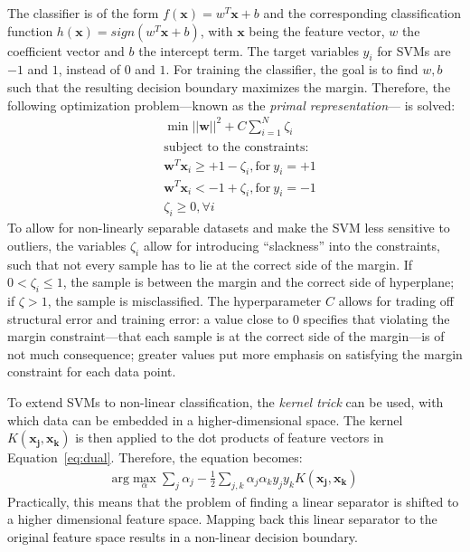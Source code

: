 \documentclass[a4paper]{article}
\begin{document}
The classifier is of the form $f(\mathbf{x}) = w^T\mathbf{x} + b$ and
the corresponding classification function
$h(\mathbf{x}) = sign(w^T\mathbf{x} + b)$, with $\mathbf{x}$ being the
feature vector, $w$ the coefficient vector and $b$ the intercept
term. The target variables $y_i$ for SVMs are $-1$ and $1$, instead of
$0$ and $1$. For training the classifier, the goal is to find $w, b$
such that the resulting decision boundary maximizes the margin.
Therefore, the following optimization problem---known as the
\emph{primal representation}--- is solved:
\begin{align}
  & \min ||\mathbf{w}||^2 + C \sum_{i = 1}^N\zeta_i\\
  & \text{subject to the constraints:}\\
 & \mathbf{w}^T\mathbf{x}_i \geq + 1 - \zeta_i, \text{for}~y_i =
  +1\\
 & \mathbf{w}^T\mathbf{x}_i < - 1 + \zeta_i, \text{for}~y_i =
  -1\\
& \zeta_i \geq 0, \forall i
\end{align}
To allow for non-linearly separable datasets and make the SVM less
sensitive to outliers, the variables $\zeta_i$ allow for introducing
``slackness'' into the constraints, such that not every sample has to
lie at the correct side of the margin. If $0 < \zeta_i \leq 1$, the
sample is between the margin and the correct side of hyperplane; if
$\zeta > 1$, the sample is misclassified. The hyperparameter $C$
allows for trading off structural error and training error: a value
close to 0 specifies that violating the margin constraint---that each
sample is at the correct side of the margin---is of not much
consequence; greater values put more emphasis on satisfying the margin
constraint for each data point.

To extend SVMs to non-linear classification, the \emph{kernel trick}
can be used, with which data can be embedded in a higher-dimensional
space. The kernel $K(\mathbf{x_j}, \mathbf{x_k})$ is then applied to
the dot products of feature vectors in
Equation~\ref{eq:dual}. Therefore, the equation becomes:
\begin{align}
\label{eq:dualkernel}
  \text{arg}\max_\alpha\sum_j\alpha_j - \frac{1}{2}\sum_{j,k}\alpha_j\alpha_ky_jy_kK(\mathbf{x_j}, \mathbf{x_k})
\end{align} 
Practically, this means that the problem of finding a linear separator
is shifted to a higher dimensional feature space. Mapping back this
linear separator to the original feature space results in a non-linear
decision boundary.
\end{document}
